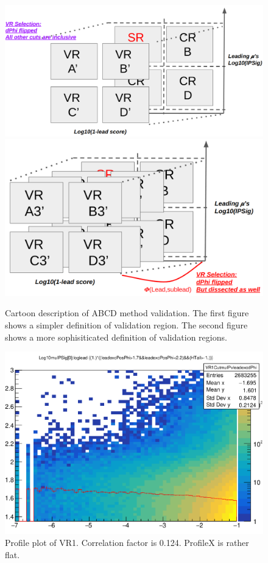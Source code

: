 \begin{figure}[h!]
  \caption{Cartoon description of ABCD method validation. The first figure shows a simpler definition of validation region. The second figure shows a more sophisiticated definition of validation regions. }
  \label{fig:valcar}
  \centering
  \includegraphics[width=0.85\linewidth]{figs/SimpleVR.png}
  \includegraphics[width=0.85\linewidth]{figs/SophiVR.png}

\end{figure}


\begin{figure}[h!]
  \caption{Profile plot of VR1. Correlation factor is 0.124. ProfileX is rather flat.}
  \label{fig:valcar2}
  \centering
  \includegraphics[width=0.65\linewidth]{figs/VR1.png}

\end{figure}

